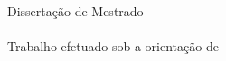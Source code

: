 \begin{titlepage}
\color{PANTONECoolGray7C}
\thelogo
\leading{20.4pt}
{\Large
\theauthor
\\
%
\\
\textbf{\thetitleA}
\\
\textbf{\thetitleB}
\\
\textbf{\thetitleC}
}

\vspace*{\fill}
{\footnotesize \myear}
\end{titlepage}

\null
\thispagestyle{empty}
\pagecolor{PANTONECoolGray7C}
\afterpage{\nopagecolor}
\newpage

\begin{titlepage}
\color{PANTONECoolGray7C}
\thelogoB
\leading{20.4pt}
{\Large
\theauthor
\\
%
\\
\textbf{\thetitleA}
\\
\textbf{\thetitleB}
\\
\textbf{\thetitleC}
}

\vspace{55.2mm}
\leading{16.8pt}
{\large
Dissertação de Mestrado
\\
\themasters
\\
\thearea
Trabalho efetuado sob a orientação de
\\
\textbf{\thesupervisor}
\\
\thecosupervisor}

\vspace*{\fill}
{\footnotesize \myear}
\end{titlepage}